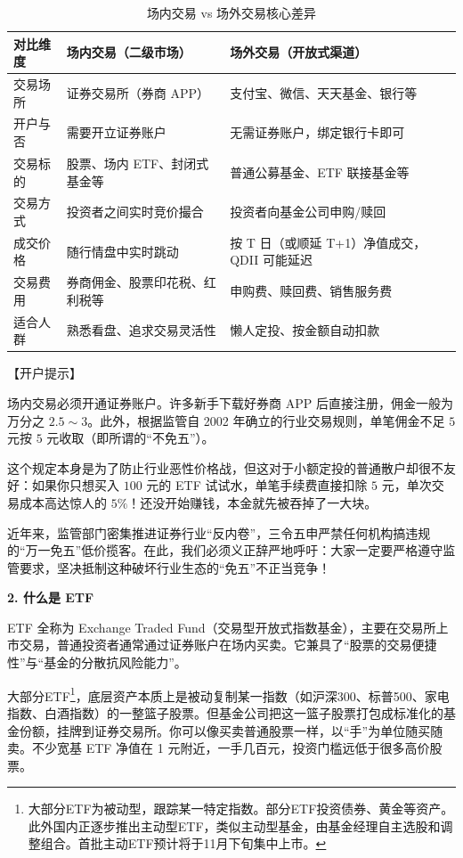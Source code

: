 \documentclass[12pt,openany]{book}
\newcommand{\subhead}[1]{%
    \par\vspace{0.5\baselineskip}%
    \noindent\textbf{#1}\par%
    \vspace{0.5\baselineskip}%
}
\begin{document}
\begin{table}[tbp]
\centering
\small
\singlespacing
\caption{场内交易 vs 场外交易核心差异}
\label{tab:in_out_market}
\renewcommand{\arraystretch}{1.1}
\setlength{\tabcolsep}{5pt}
\begin{tabularx}{\linewidth}{|>{\centering\arraybackslash\hsize=0.55\hsize}X|>{\centering\arraybackslash\hsize=1.15\hsize}X|>{\centering\arraybackslash\hsize=1.3\hsize}X|}
\hline
对比维度 & 场内交易（二级市场） & 场外交易（开放式渠道） \\ \hline
交易场所 & 证券交易所（券商 APP） & 支付宝、微信、天天基金、银行等 \\ \hline
开户与否 & 需要开立证券账户 & 无需证券账户，绑定银行卡即可 \\ \hline
交易标的 & 股票、场内 ETF、封闭式基金等 & 普通公募基金、ETF 联接基金等 \\ \hline
交易方式 & 投资者之间实时竞价撮合 & 投资者向基金公司申购/赎回 \\ \hline
成交价格 & 随行情盘中实时跳动 & 按 T 日（或顺延 T+1）净值成交，QDII 可能延迟 \\ \hline
交易费用 & 券商佣金、股票印花税、红利税等 & 申购费、赎回费、销售服务费 \\ \hline
适合人群 & 熟悉看盘、追求交易灵活性 & 懒人定投、按金额自动扣款 \\ \hline
\end{tabularx}
\end{table}

【开户提示】

场内交易必须开通证券账户。许多新手下载好券商 APP 后直接注册，佣金一般为万分之 $2.5\sim 3$。此外，根据监管自 2002 年确立的行业交易规则，单笔佣金不足 $5$ 元按 $5$ 元收取（即所谓的“不免五”）。

这个规定本身是为了防止行业恶性价格战，但这对于小额定投的普通散户却很不友好：如果你只想买入 $100$ 元的 ETF 试试水，单笔手续费直接扣除 $5$ 元，单次交易成本高达惊人的 $5\%$！还没开始赚钱，本金就先被吞掉了一大块。

近年来，监管部门密集推进证券行业“反内卷”，三令五申严禁任何机构搞违规的“万一免五”低价揽客。在此，我们必须义正辞严地呼吁：大家一定要严格遵守监管要求，坚决抵制这种破坏行业生态的“免五”不正当竞争！

\subhead{2. 什么是 ETF}

ETF 全称为 Exchange Traded Fund（交易型开放式指数基金），主要在交易所上市交易，普通投资者通常通过证券账户在场内买卖。它兼具了“股票的交易便捷性”与“基金的分散抗风险能力”。

大部分ETF\footnote{大部分ETF为被动型，跟踪某一特定指数。部分ETF投资债券、黄金等资产。此外国内正逐步推出主动型ETF，类似主动型基金，由基金经理自主选股和调整组合。首批主动ETF预计将于11月下旬集中上市。}，底层资产本质上是被动复制某一指数（如沪深300、标普500、家电指数、白酒指数）的一整篮子股票。但基金公司把这一篮子股票打包成标准化的基金份额，挂牌到证券交易所。你可以像买卖普通股票一样，以“手”为单位随买随卖。不少宽基 ETF 净值在 1 元附近，一手几百元，投资门槛远低于很多高价股票。
\end{document}
